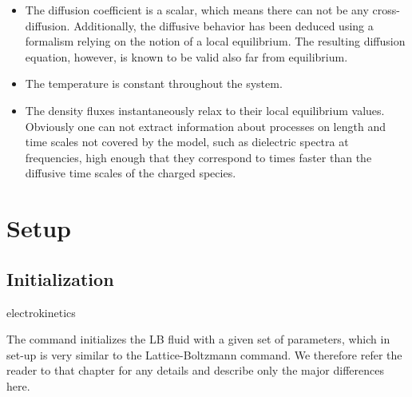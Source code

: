 \begin{itemize}
	\item The diffusion coefficient is a scalar, which means there can not be any
	cross-diffusion. Additionally, the diffusive behavior has been deduced using
	a formalism relying on the notion of a local equilibrium. The resulting
	diffusion equation, however, is known to be valid also far from equilibrium.
	
	\item The temperature is constant throughout the system.
	
	\item The density fluxes instantaneously relax to their local equilibrium
	values. Obviously one can not extract information about processes on length
	and time scales not covered by the model, such as dielectric spectra at
	frequencies, high enough that they correspond to times faster than the
	diffusive time scales of the charged species.
\end{itemize}

\section{Setup}

\subsection{\label{ssec:ek-init}Initialization}

\begin{essyntax}
  electrokinetics
  \begin{features}
  \end{features}
\end{essyntax}
The  command initializes the LB fluid with a given
set of parameters, which in set-up is very similar to the Lattice-Boltzmann 
 command. We therefore refer the reader to that chapter for any 
details and describe only the major differences here. 

